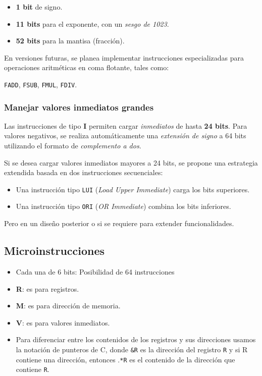 \documentclass{article}
\begin{document}
\begin{itemize}
    \item \textbf{1 bit} de signo.
    \item \textbf{11 bits} para el exponente, con un \textit{sesgo de 1023}.
    \item \textbf{52 bits} para la mantisa (fracción).
\end{itemize}

En versiones futuras, se planea implementar instrucciones especializadas para operaciones aritméticas en coma flotante, tales como:

\texttt{FADD}, \texttt{FSUB}, \texttt{FMUL}, \texttt{FDIV}.

\subsubsection{Manejar valores inmediatos grandes}

Las instrucciones de tipo \textbf{I} permiten cargar \textit{inmediatos} de hasta \textbf{24 bits}.  
Para valores negativos, se realiza automáticamente una \textit{extensión de signo} 
a 64 bits utilizando el formato de \textit{complemento a dos}.

Si se desea cargar valores inmediatos mayores a 24 bits, se propone una 
estrategia extendida basada en dos instrucciones secuenciales:

\begin{itemize}
    \item Una instrucción tipo \texttt{LUI} (\textit{Load Upper Immediate}) carga los bits superiores.
    \item Una instrucción tipo \texttt{ORI} (\textit{OR Immediate}) combina los bits inferiores.
\end{itemize}

Pero en un diseño posterior o si se requiere para extender funcionalidades.



\subsection{Microinstrucciones}

\begin{itemize}
  \item Cada una de 6 bits: Posibilidad de 64 instrucciones
  \item \textbf{R}: es para registros.
  \item \textbf{M}: es para dirección de memoria.
  \item \textbf{V}: es para valores inmediatos.
  \item Para diferenciar entre los contenidos de los registros y sus direcciones usamos la notación de punteros de C, donde \texttt{\&R} es la dirección del registro \texttt{R} y si R contiene una dirección, entonces .\texttt{*R} es el contenido de la dirección que contiene \texttt{R}.
\end{itemize}
\end{document}
